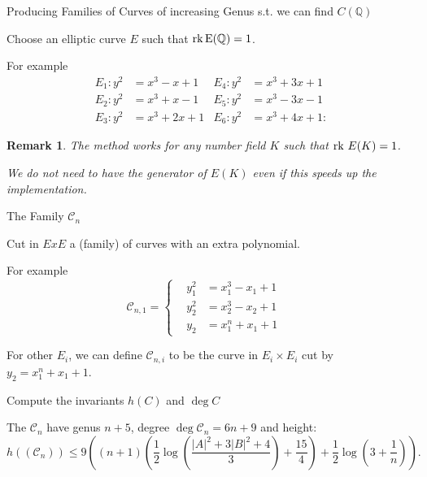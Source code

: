 \documentclass[handout]{beamer}
\newcommand{\Ci}{\mathcal{C}}
\newtheorem{remark}{Remark}
\begin{document}
\begin{frame}{Producing Families of Curves of increasing Genus s.t. we can find $C(\mathbb{Q})$}

\begin{alertblock} {Choose an elliptic curve $E$  such that $\rm{rk} \,E({\mathbb{Q}})=1$. }\end{alertblock}

 For example
\[
		\begin{aligned}
			E_1 \colon y^2 &= x^3 - x + 1 & E_4 \colon y^2 &= x^3 + 3 x + 1 \\
			E_2 \colon y^2 &= x^3 + x - 1 & E_5 \colon y^2 &= x^3 - 3 x - 1 \\
			E_3 \colon y^2 &= x^3 + 2 x + 1 & E_6 \colon y^2 &= x^3 + 4 x + 1 \colon 
		\end{aligned}
	\]


\begin{remark}
The method works for any number field $K$ such that ${\rm{rk} }\,\,E(K)=1$.

 We do not need to have the generator of $E(K)$ even if this speeds up the implementation.
\end{remark}
\end{frame}
\begin{frame}{The Family $\Ci_n$}
\begin{alertblock}{
Cut in $ExE$ a (family) of curves with an extra polynomial.}
\end{alertblock}


For example
\begin{equation*}
\mathcal{C}_{n,1}=\begin{cases}
\,\,\,\,\,y_1^2&=x_1^3-x_1+1\,\,\,\,\,\,\,\,\\
\,\,\,\,\,y_2^2&=x_2^3-x_2+1\,\,\,\,\,\,\,\,\\
\,\,\,\,\,y_2&=x_1^n+x_1+1
\end{cases}
\end{equation*}

\pause
For other $E_i$, we can define  $\mathcal{C}_{n,i}$ to be the curve in $E_i\times E_i$ cut by $y_2=x_1^n+x_1+1$.
\pause
\begin{alertblock}{Compute the invariants $h(C)$ and $\deg C$}
\end{alertblock}
The $\Ci_n$ have genus $n+5$, degree $\deg \Ci_n= 6n+9$ and height:
\[
	h((\mathcal{C}_n)) \leq 9 \left((n+1) \left( \frac{1}{2} \log\left( \frac{\lvert A \rvert^2 + 3 \lvert B \rvert^2 + 4}{3} \right) + \frac{15}{4} \right) + \frac{1}{2} \log\left( 3 + \frac{1}{n} \right) \right).
	\]

\end{frame}
\end{document}
